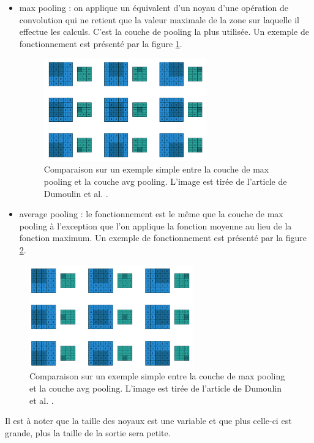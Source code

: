 \begin{itemize}
 \item max pooling : on applique un équivalent d'un noyau d'une opération de convolution qui ne retient que la valeur maximale de la zone sur laquelle il effectue les calculs. C'est la couche de pooling la plus utilisée. Un exemple de fonctionnement est présenté par la figure \ref{max_pooling}.
 
\begin{figure}[!h]
\centering
\includegraphics[width=200pt]{images/cnn/max_pooling.png}
\caption{Comparaison sur un exemple simple entre la couche de max pooling et la couche avg pooling. L'image est tirée de l'article de Dumoulin et al. \cite{dumoulin_guide_2018}.}
\label{max_pooling}
\end{figure}
 
\item average pooling : le fonctionnement est le même que la couche de max pooling à l'exception que l'on applique la fonction moyenne au lieu de la fonction maximum. Un exemple de fonctionnement est présenté par la figure \ref{avg_pooling}.
\end{itemize}

\begin{figure}[!h]
\centering
\includegraphics[width=200pt]{images/cnn/avg_pooling.png}
\caption{Comparaison sur un exemple simple entre la couche de max pooling et la couche avg pooling. L'image est tirée de l'article de Dumoulin et al. \cite{dumoulin_guide_2018}.}
\label{avg_pooling}
\end{figure}


Il est à noter que la taille des noyaux est une variable et que plus celle-ci est grande, plus la taille de la sortie sera petite. 
